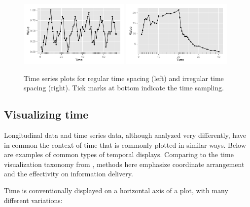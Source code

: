 \documentclass[12pt]{article}
\begin{document}
\begin{figure}[h]
\begin{centering}
\includegraphics[width=0.48\textwidth]{graph/pipeline-01-regular} \includegraphics[width=0.48\textwidth]{graph/pipeline-01-irregular}
\end{centering}

\caption{\label{fig:Time-series-plots}Time series plots for regular time spacing
 (left) and irregular time spacing  (right). Tick marks at bottom indicate the time sampling.}
\end{figure}

\subsection{Visualizing time}

Longitudinal data and time series data, although analyzed
very differently, have in common the context of time that
is commonly plotted in similar ways. Below are examples of
common types of temporal displays. Comparing to the time
visualization taxonomy from \citet{aigner2011visualization},
methods here emphasize coordinate arrangement and the
effectivity on information delivery.

Time is conventionally displayed on a horizontal axis of a plot, with many different variations:
\end{document}
